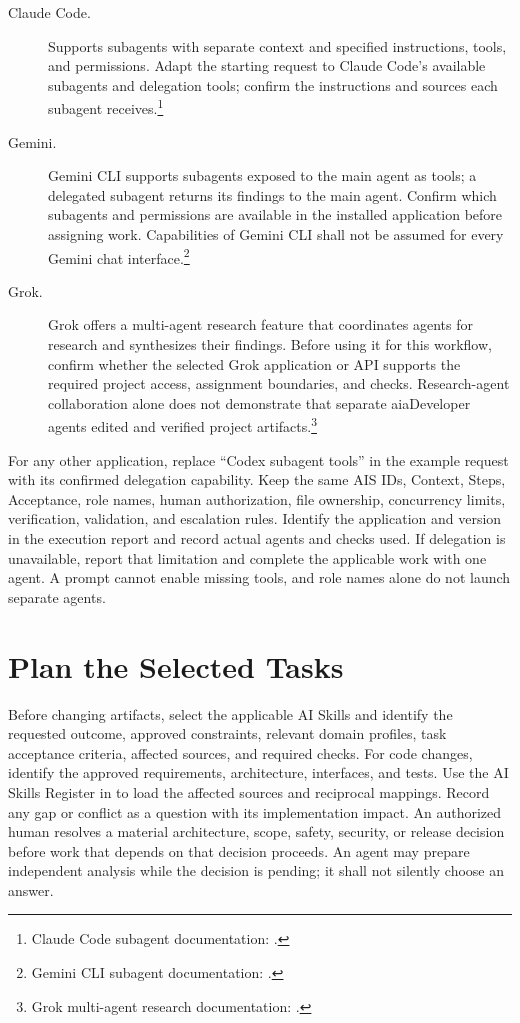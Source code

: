\begin{description}
\item[Claude Code.] Supports subagents with separate context and specified
instructions, tools, and permissions. Adapt the starting request to Claude
Code's available subagents and delegation tools; confirm the instructions
and sources each subagent receives.\footnote{Claude Code subagent documentation:
\cite{ClaudeCodeSubagents}.}
\item[Gemini.] Gemini CLI supports subagents exposed to the main agent as tools;
a delegated subagent returns its findings to the main agent. Confirm which
subagents and permissions are available in the installed application before
assigning work. Capabilities of Gemini CLI shall not be assumed for every
Gemini chat interface.\footnote{Gemini CLI subagent documentation:
\cite{GeminiCLISubagents}.}
\item[Grok.] Grok offers a multi-agent research feature that coordinates agents
for research and synthesizes their findings. Before using it for this workflow,
confirm whether the selected Grok application or API supports the required
project access, assignment boundaries, and checks. Research-agent collaboration
alone does not demonstrate that separate aiaDeveloper agents edited and verified
project artifacts.\footnote{Grok multi-agent research documentation:
\cite{GrokMultiAgent}.}
\end{description}

For any other application, replace ``Codex subagent tools'' in the example
request with its confirmed delegation capability. Keep the same AIS IDs,
Context, Steps, Acceptance, role names, human authorization, file ownership,
concurrency limits, verification, validation, and escalation rules. Identify
the application and version in the execution report and record actual agents
and checks used. If delegation is unavailable, report that limitation and
complete the applicable work with one agent. A prompt cannot enable missing
tools, and role names alone do not launch separate agents.

\section{Plan the Selected Tasks}
\label{Section:AIImplementationPlan}
Before changing artifacts, select the applicable AI Skills and identify the
requested outcome, approved constraints, relevant domain profiles, task
acceptance criteria, affected sources, and required checks. For code changes,
identify the approved requirements, architecture, interfaces, and tests. Use the AI Skills Register in
 to load the affected sources and reciprocal mappings.
Record any gap or conflict as a question with its implementation impact. An
authorized human resolves a material architecture, scope, safety, security, or
release decision before work that depends on that decision proceeds. An agent
may prepare independent analysis while the decision is pending; it shall not
silently choose an answer.

